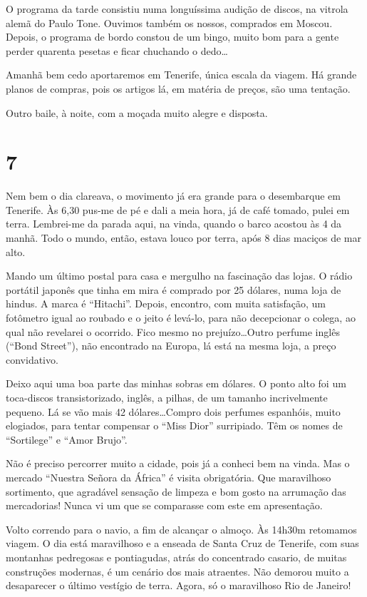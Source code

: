 O programa da tarde consistiu numa longuíssima audição de discos, na vitrola alemã do Paulo Tone. Ouvimos também os nossos, comprados em Moscou. Depois, o programa de bordo constou de um bingo, muito bom para a gente perder quarenta pesetas e ficar chuchando o dedo\ldots

Amanhã bem cedo aportaremos em Tenerife, única escala da viagem. Há grande planos de compras, pois os artigos lá, em matéria de preços, são uma tentação.

Outro baile, à noite, com a moçada muito alegre e disposta.

\section*{7 \adfflatleafright {}}
Nem bem o dia clareava, o movimento já era grande para o desembarque em Tenerife. Às 6,30 pus-me de pé e dali a meia hora, já de café tomado, pulei em terra. Lembrei-me da parada aqui, na vinda, quando o barco acostou às 4 da manhã. Todo o mundo, então, estava louco por terra, após 8 dias maciços de mar alto.

Mando um último postal para casa e mergulho na fascinação das lojas. O rádio portátil japonês que tinha em mira é comprado por 25 dólares, numa loja de hindus. A marca é ``Hitachi''. Depois, encontro, com muita satisfação, um fotômetro igual ao roubado e o jeito é levá-lo, para não decepcionar o colega, ao qual não revelarei o ocorrido. Fico mesmo no prejuízo\ldots Outro perfume inglês (``Bond Street''), não encontrado na Europa, lá está na mesma loja, a preço convidativo.

Deixo aqui uma boa parte das minhas sobras em dólares. O ponto alto foi um toca-discos transistorizado, inglês, a pilhas, de um tamanho incrivelmente pequeno. Lá se vão mais 42 dólares\ldots Compro dois perfumes espanhóis, muito elogiados, para tentar compensar o ``Miss Dior'' surripiado. Têm os nomes de ``Sortilege'' e ``Amor Brujo''.

Não é preciso percorrer muito a cidade, pois já a conheci bem na vinda. Mas o mercado ``Nuestra Señora da África'' é visita obrigatória. Que maravilhoso sortimento, que agradável sensação de limpeza e bom gosto na arrumação das mercadorias! Nunca vi um que se comparasse com este em apresentação.

Volto correndo para o navio, a fim de alcançar o almoço. Às 14h30m retomamos viagem. O dia está maravilhoso e a enseada de Santa Cruz de Tenerife, com suas montanhas pedregosas e pontiagudas, atrás do concentrado casario, de muitas construções modernas, é um cenário dos mais atraentes. Não demorou muito a desaparecer o último vestígio de terra. Agora, só o maravilhoso Rio de Janeiro!

